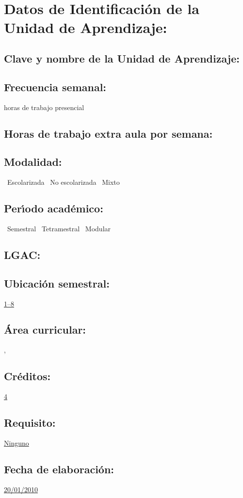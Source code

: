 \documentclass[10 pt]{article}
\begin{document}


\section{Datos de Identificaci\'{o}n de la Unidad de Aprendizaje:}
\subsection{Clave y nombre de la Unidad de Aprendizaje:} 
\subsection{Frecuencia semanal:} horas de trabajo presencial 
\subsection{Horas de trabajo extra aula por semana:} 
\subsection{Modalidad:} \yes~Escolarizada \no~No escolarizada \no~Mixto
\subsection{Per\'{\i}odo acad\'{e}mico:} \yes~Semestral
\no~Tetramestral \no~Modular
\subsection{LGAC:} \underline{\seys}
\subsection{Ubicaci\'{o}n semestral:} \underline{1--8}
\subsection{\'{A}rea curricular:} \underline{\fr, \le}
\subsection{Cr\'{e}ditos:} \underline{4}
\subsection{Requisito:} \underline{Ninguno}
\subsection{Fecha de elaboraci\'{o}n:} \underline{20/01/2010}
\end{document}
